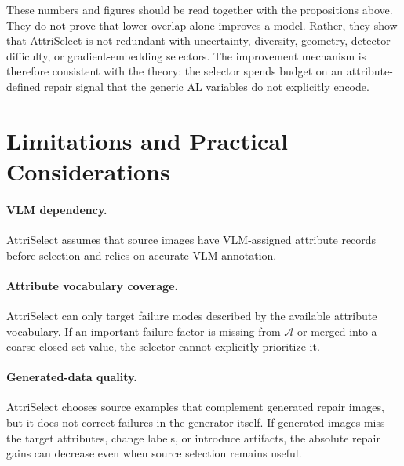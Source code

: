 \documentclass{article}
\newcommand{\model}{AttriSelect\xspace}
\newcommand{\attrs}{\mathcal{A}}
\begin{document}
These numbers and figures should be read together with the propositions above. They do not prove that lower overlap alone improves a model. Rather, they show that \model is not redundant with uncertainty, diversity, geometry, detector-difficulty, or gradient-embedding selectors. The improvement mechanism is therefore consistent with the theory: the selector spends budget on an attribute-defined repair signal that the generic AL variables do not explicitly encode.

\section{Limitations and Practical Considerations}
\label{app:limitations}

\paragraph{VLM dependency.}
\model assumes that source images have VLM-assigned attribute records before selection and relies on accurate VLM annotation.

\paragraph{Attribute vocabulary coverage.}
\model can only target failure modes described by the available attribute vocabulary. If an important failure factor is missing from $\attrs$ or merged into a coarse closed-set value, the selector cannot explicitly prioritize it.

\paragraph{Generated-data quality.}
\model chooses source examples that complement generated repair images, but it does not correct failures in the generator itself. If generated images miss the target attributes, change labels, or introduce artifacts, the absolute repair gains can decrease even when source selection remains useful.

\clearpage

\end{document}
